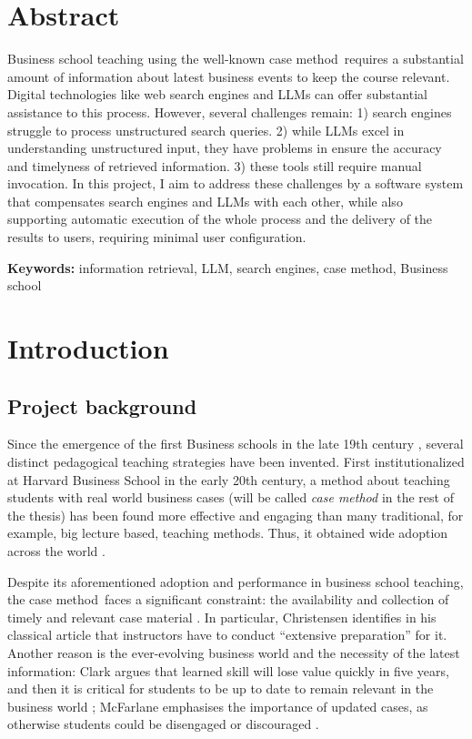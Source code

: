 \documentclass[final-report]{report-template}
\newcommand\casemethod{case method}
\begin{document}
\section*{Abstract}
Business school teaching using the well-known \casemethod\ requires a
substantial amount of information about latest business events to keep the
course relevant.  Digital technologies like web search engines and LLMs can
offer substantial assistance to this process. However, several challenges
remain: 1) search engines struggle to process unstructured search queries. 2)
while LLMs excel in understanding unstructured input, they have problems in
ensure the accuracy and timelyness of retrieved information. 3) these tools
still require manual invocation. In this project, I aim to address these
challenges by a software system that compensates search engines and LLMs with
each other, while also supporting automatic execution of the whole process and
the delivery of the results to users, requiring minimal user configuration.

\textbf{Keywords:} information retrieval, LLM, search
engines, \casemethod, Business school

\section{Introduction}
\subsection{Project background} \label{sec.proj.bg}
Since the emergence of the first Business schools in the late 19th century
\cite{first.bis.school.1, first.bis.school.2}, several distinct pedagogical
teaching strategies have been invented.  First institutionalized at Harvard
Business School \cite{case.method.origin.1, case.method.origin.2} in the early
20th century, a method about teaching students with real world business cases
(will be called \emph{\casemethod} in the rest of the thesis) has been found
more effective and engaging \cite{case.method.support.1, case.method.support.2,
case.method.support.3} than many traditional, for example, big lecture based,
teaching methods. Thus, it obtained wide adoption across the world
\cite{case.method.adoption.1, case.method.adoption.2}.

Despite its aforementioned adoption and performance in business school
teaching, the \casemethod\ faces a significant constraint: the availability and
collection of timely and relevant case material \cite{case.method.limit.1,
case.method.limit.3}. In particular, Christensen identifies in his classical
article that instructors have to conduct ``extensive preparation''
\cite{case.method.limit.2} for it. Another reason is the ever-evolving business
world and the necessity of the latest information: Clark argues that learned
skill will lose value quickly in five years, and then it is critical for
students to be up to date to remain relevant in the business world
\cite{case.method.limit.4}; McFarlane emphasises the importance of updated
cases, as otherwise students could be disengaged or discouraged
\cite{case.method.limit.5}.
\end{document}
